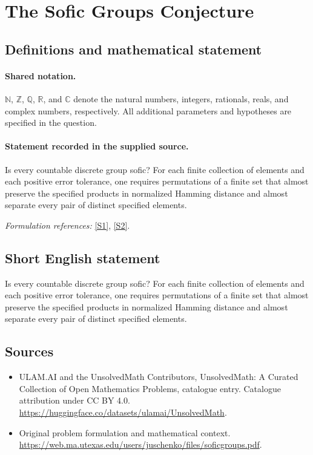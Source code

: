 \documentclass[11pt]{article}
\newcommand{\sref}[2]{\hyperlink{source:#1:#2}{[S#2]}}
\begin{document}
\section{The Sofic Groups Conjecture}\label{statement}

\subsection{Definitions and mathematical statement}

\paragraph{Shared notation.}$\mathbb N$, $\mathbb Z$, $\mathbb Q$, $\mathbb R$, and $\mathbb C$ denote the natural numbers, integers, rationals, reals, and complex numbers, respectively. All additional parameters and hypotheses are specified in the question.


\paragraph{Statement recorded in the supplied source.}
Is every countable discrete group sofic? For each finite collection of elements and each positive error tolerance, one requires permutations of a finite set that almost preserve the specified products in normalized Hamming distance and almost separate every pair of distinct specified elements.
\par\smallskip\textit{Formulation references:} \sref{statement}{1}, \sref{statement}{2}.
\subsection{Short English statement}
Is every countable discrete group sofic? For each finite collection of elements and each positive error tolerance, one requires permutations of a finite set that almost preserve the specified products in normalized Hamming distance and almost separate every pair of distinct specified elements.
\subsection{Sources}
\begin{itemize}
\item[\hypertarget{source:statement:1}{S1}] ULAM.AI and the UnsolvedMath Contributors, UnsolvedMath: A Curated Collection of Open Mathematics Problems, catalogue entry. Catalogue attribution under CC BY 4.0.
\url{https://huggingface.co/datasets/ulamai/UnsolvedMath}.
\item[\hypertarget{source:statement:2}{S2}] Original problem formulation and mathematical context.
\url{https://web.ma.utexas.edu/users/juschenko/files/soficgroups.pdf}.
\end{itemize}
\label{end:statement}
\end{document}
